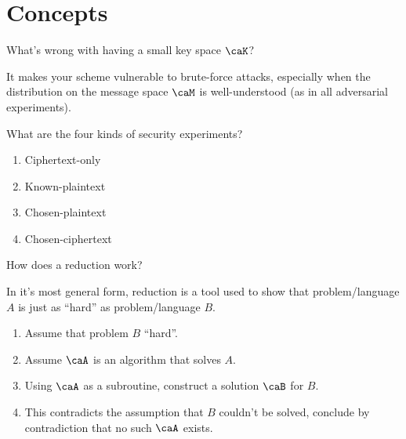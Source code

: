 \documentclass[a5paper]{article}
\begin{document}
\section{Concepts}
\label{sec:concepts}

\begin{note}
  \begin{field}
    What's wrong with having a small key space $\caK$?
  \end{field}

  \begin{field}
    It makes your scheme vulnerable to brute-force attacks, especially when the
    distribution on the message space $\caM$ is well-understood (as in all
    adversarial experiments).
  \end{field}
\end{note}

\begin{note}
  \begin{field}
    What are the four kinds of security experiments?
  \end{field}

  \begin{field}
    \begin{enumerate}%
      \itemsep0em
      \item Ciphertext-only
      \item Known-plaintext
      \item Chosen-plaintext
      \item Chosen-ciphertext
    \end{enumerate}
  \end{field}
\end{note}

\begin{note}
  \begin{field}
    How does a reduction work?
  \end{field}

  \begin{field}
    In it's most general form, reduction is a tool used to show that
    problem/language $A$ is just as ``hard'' as problem/language $B$.
    \begin{enumerate}%
      \itemsep0em
      \item Assume that problem $B$ ``hard''.
      \item Assume $\caA$ is an algorithm that solves $A$.
      \item Using $\caA$ as a subroutine, construct a solution $\caB$ for $B$.
      \item This contradicts the assumption that $B$ couldn't be solved,
        conclude by contradiction that no such $\caA$ exists.
    \end{enumerate}
  \end{field}
\end{note}
\end{document}
